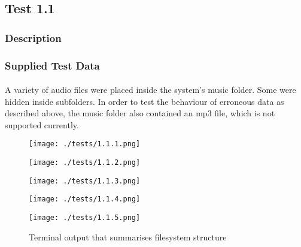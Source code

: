 \pagebreak
\subsection{Test 1.1}
\subsubsection{Description}
\paragraph{}
{
	\centering
}

\subsubsection{Supplied Test Data}
\paragraph{}
A variety of audio files were placed inside the system's music folder. Some were hidden inside subfolders. In order to test the behaviour of erroneous data as described above, the music folder also contained an mp3 file, which is not supported currently.

\begin{figure}[H]
	\texttt{[image: ./tests/1.1.1.png]}
\end{figure}
\begin{figure}[H]
	\texttt{[image: ./tests/1.1.2.png]}
\end{figure}
\begin{figure}[H]
	\texttt{[image: ./tests/1.1.3.png]}
\end{figure}
\begin{figure}[H]
	\texttt{[image: ./tests/1.1.4.png]}
\end{figure}
\begin{figure}[H]
	\texttt{[image: ./tests/1.1.5.png]}
	\caption{Terminal output that summarises filesystem structure}
\end{figure}

